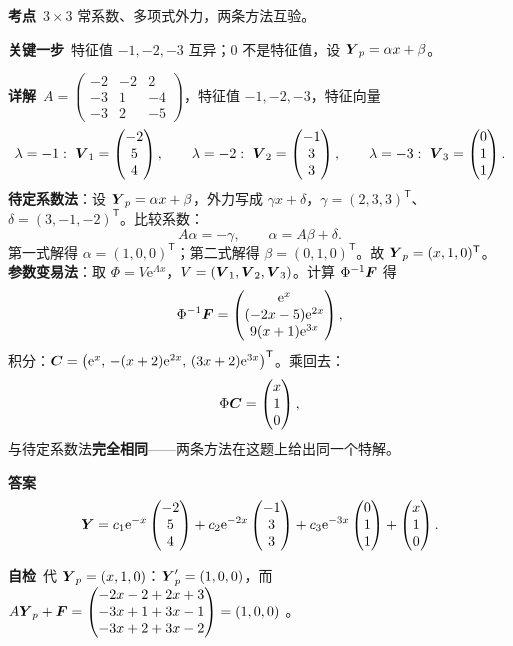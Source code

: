 \documentclass[11pt]{ctexart}
\renewcommand{\qbreak}{\needspace{0.26\textheight}}
\newcommand{\qpagebreak}{\needspace{0.92\textheight}}
\newcommand{\mat}[1]{\begin{pmatrix}#1\end{pmatrix}}
\begin{document}
\qpagebreak
{}
\label{c4:app:hw}
\qbreak
{}
\par\textbf{考点}\ $3\times3$ 常系数、多项式外力，两条方法互验。
\par\textbf{关键一步}\ 特征值 $-1,-2,-3$ 互异；$0$ 不是特征值，设 $\boldsymbol{Y}_p=\alpha x+\beta$。
\par\textbf{详解}\ $A=\mat{-2&-2&2\\-3&1&-4\\-3&2&-5}$，特征值 $-1,-2,-3$，特征向量
\[
\lambda=-1:\ \vect{V}_1=\mat{-2\\5\\4},\qquad \lambda=-2:\ \vect{V}_2=\mat{-1\\3\\3},\qquad \lambda=-3:\ \vect{V}_3=\mat{0\\1\\1}.
\]
\textbf{待定系数法}：设 $\boldsymbol{Y}_p=\alpha x+\beta$，外力写成 $\gamma x+\delta$，$\gamma=(2,3,3)^{\mathsf T}$、$\delta=(3,-1,-2)^{\mathsf T}$。比较系数：
\[
A\alpha=-\gamma,\qquad \alpha=A\beta+\delta .
\]
第一式解得 $\alpha=(1,0,0)^{\mathsf T}$；第二式解得 $\beta=(0,1,0)^{\mathsf T}$。故 $\boldsymbol{Y}_p=(x,1,0)^{\mathsf T}$。
\textbf{参数变易法}：取 $\Phi=V\mathrm{e}^{\Lambda x}$，$V=(\boldsymbol{V}_1,\boldsymbol{V}_2,\boldsymbol{V}_3)$。计算 $\Phi^{-1}\boldsymbol{F}$ 得
\[
\Phi^{-1}\vect{F}=\mat{\mathrm{e}^{x}\\(-2x-5)\mathrm{e}^{2x}\\9(x+1)\mathrm{e}^{3x}},
\]
积分：$\boldsymbol{C}=\bigl(\mathrm{e}^x,\,-(x+2)\mathrm{e}^{2x},\,(3x+2)\mathrm{e}^{3x}\bigr)^{\mathsf T}$。乘回去：
\[
\Phi\vect{C}=\mat{x\\1\\0},
\]
与待定系数法\textbf{完全相同}——两条方法在这题上给出同一个特解。
\par\textbf{答案}\
\[
\vect{Y}=c_1\mathrm{e}^{-x}\mat{-2\\5\\4}+c_2\mathrm{e}^{-2x}\mat{-1\\3\\3}+c_3\mathrm{e}^{-3x}\mat{0\\1\\1}+\mat{x\\1\\0}.
\]
\par\textbf{自检}\ 代 $\boldsymbol{Y}_p=(x,1,0)$：$\boldsymbol{Y}_p'=(1,0,0)$，而 $A\vect{Y}_p+\vect{F}=\mat{-2x-2+2x+3\\-3x+1+3x-1\\-3x+2+3x-2}=(1,0,0)$ 。
\end{document}
